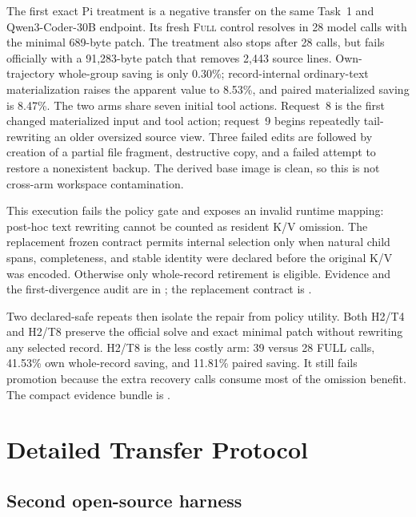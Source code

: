 \documentclass[11pt]{article}
\begin{document}
The first exact Pi treatment is a negative transfer on the same Task~1 and
Qwen3-Coder-30B endpoint.  Its fresh \textsc{Full} control resolves in 28 model
calls with the minimal 689-byte patch.  The treatment also stops after 28
calls, but fails officially with a 91,283-byte patch that removes 2,443 source
lines.  Own-trajectory whole-group saving is only 0.30\%; record-internal
ordinary-text materialization raises the apparent value to 8.53\%, and paired
materialized saving is 8.47\%.  The two arms share seven initial tool actions.
Request~8 is the first changed materialized input and tool action; request~9
begins repeatedly tail-rewriting an older oversized source view.  Three failed
edits are followed by creation of a partial file fragment, destructive copy,
and a failed attempt to restore a nonexistent backup.  The derived base image
is clean, so this is not cross-arm workspace contamination.

This execution fails the policy gate and exposes an invalid runtime mapping:
post-hoc text rewriting cannot be counted as resident K/V omission.  The
replacement frozen contract permits internal selection only when natural
child spans, completeness, and stable identity were declared before the
original K/V was encoded.  Otherwise only whole-record retirement is eligible.
Evidence and the first-divergence audit are in
; the replacement contract
is .

Two declared-safe repeats then isolate the repair from policy utility.  Both
H2/T4 and H2/T8 preserve the official solve and exact minimal patch without
rewriting any selected record.  H2/T8 is the less costly arm: 39 versus 28
FULL calls, 41.53\% own whole-record saving, and 11.81\% paired saving.  It
still fails promotion because the extra recovery calls consume most of the
omission benefit.  The compact evidence bundle is
.

\section{Detailed Transfer Protocol}

\subsection{Second open-source harness}
\end{document}
